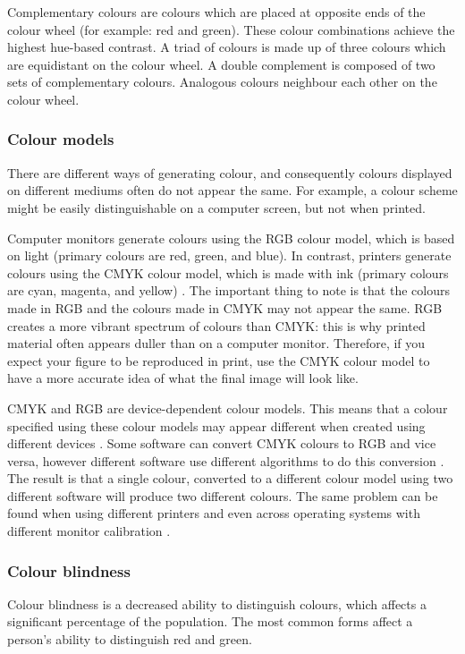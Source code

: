 \documentclass[letterpaper]{report}\usepackage[]{graphicx}\usepackage[]{color}
\begin{document}
Complementary colours are colours which are placed at opposite ends of the colour wheel (for example: red and green). These colour combinations achieve the highest hue-based contrast. A triad of colours is made up of three colours which are equidistant on the colour wheel. A double complement is composed of two sets of complementary colours. Analogous colours neighbour each other on the colour wheel. 

\subsubsection{Colour models}
There are different ways of generating colour, and consequently colours displayed on different mediums often do not appear the same. For example, a colour scheme might be easily distinguishable on a computer screen, but not when printed. 

Computer monitors generate colours using the RGB colour model, which is based on light (primary colours are red, green, and blue). In contrast, printers generate colours using the CMYK colour model, which is made with ink (primary colours are cyan, magenta, and yellow) \cite{silva}. The important thing to note is that the colours made in RGB and the colours made in CMYK may not appear the same. RGB creates a more vibrant spectrum of colours than CMYK: this is why printed material often appears duller than on a computer monitor. Therefore, if you expect your figure to be reproduced in print, use the CMYK colour model to have a more accurate idea of what the final image will look like.

CMYK and RGB are device-dependent colour models. This means that a colour specified using these colour models may appear different when created using different devices \cite{silva}. Some software can convert CMYK colours to RGB and vice versa, however different software use different algorithms to do this conversion \cite{brewer-colour}. The result is that a single colour, converted to a different colour model using two different software will produce two different colours. The same problem can be found when using different printers and even across operating systems with different monitor calibration \cite{brewer-colour}. 

\subsubsection{Colour blindness}
Colour blindness is a decreased ability to distinguish colours, which affects a significant percentage of the population. The most common forms affect a person's ability to distinguish red and green.
\end{document}
